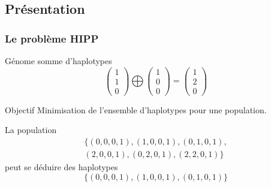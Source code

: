 \documentclass{beamer}
\begin{document}
\subsection{Présentation}
\begin{frame}
    \frametitle{Le problème HIPP}
    \begin{block}{Génome somme d'haplotypes}
            \[ \left(\begin{array}{c} 1 \\ 1 \\ 0 \end{array}\right) \bigoplus \left(\begin{array}{c} 1 \\ 0 \\ 0\end{array}\right) =
                \left(\begin{array}{c} 1 \\ 2 \\ 0 \end{array}\right) \]
    \end{block}
    \begin{block}{Objectif}
        Minimisation de l'ensemble d'haplotypes pour une population.
    \end{block}
    La population
    \[\begin{array}{c} \{(0,0,0,1),(1,0,0,1),(0,1,0,1), \\ (2,0,0,1),(0,2,0,1),(2,2,0,1)\}\end{array} \]
    peut se déduire des haplotypes
    \[\{(0,0,0,1),(1,0,0,1),(0,1,0,1)\}\]
\end{frame}
\end{document}
